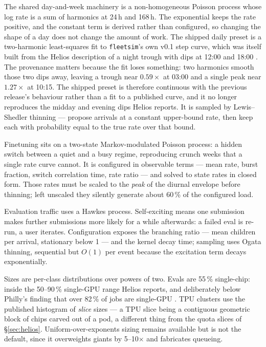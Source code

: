 The shared day-and-week machinery is a non-homogeneous Poisson process whose log
rate is a sum of harmonics at 24\,h and 168\,h. The exponential keeps the rate
positive, and the constant term is derived rather than configured, so changing
the shape of a day does not change the amount of work. The shipped daily preset
is a two-harmonic least-squares fit to \texttt{fleetsim}'s own v0.1 step curve,
which was itself built from the Helios description of a night trough with dips
at 12:00 and 18:00 \cite{helios2021}. The provenance matters because the fit
loses something: two harmonics smooth those two dips away, leaving a trough near
$0.59\times$ at 03:00 and a single peak near $1.27\times$ at 10:15. The shipped
preset is therefore continuous with the previous release's behaviour rather than
a fit to a published curve, and it no longer reproduces the midday and evening
dips Helios reports. It is sampled by Lewis--Shedler thinning --- propose
arrivals at a constant upper-bound rate, then keep each with probability equal
to the true rate over that bound.

Finetuning sits on a two-state Markov-modulated Poisson process: a hidden switch
between a quiet and a busy regime, reproducing crunch weeks that a single rate
curve cannot. It is configured in observable terms --- mean rate, burst fraction,
switch correlation time, rate ratio --- and solved to state rates in closed form.
Those rates must be scaled to the \emph{peak} of the diurnal envelope before
thinning; left unscaled they silently generate about 60\,\% of the configured
load.

Evaluation traffic uses a Hawkes process. Self-exciting means one submission
makes further submissions more likely for a while afterwards: a failed eval is
re-run, a user iterates. Configuration exposes the branching ratio --- mean
children per arrival, stationary below 1 --- and the kernel decay time; sampling
uses Ogata thinning, sequential but $O(1)$ per event because the excitation term
decays exponentially.

Sizes are per-class distributions over powers of two. Evals are 55\,\%
single-chip: inside the 50--90\,\% single-GPU range Helios reports, and
deliberately below Philly's finding that over 82\,\% of jobs are single-GPU
\cite{philly2019}. TPU clusters use the published histogram of \emph{slice}
sizes \cite{tpuv4isca2023} --- a TPU slice being a contiguous geometric block of
chips carved out of a pod, a different thing from the quota slices of
\S\ref{sec:helios}. Uniform-over-exponents sizing remains available but is not
the default, since it overweights giants by 5--10$\times$ and fabricates
queueing.

